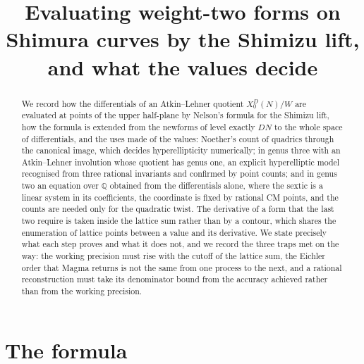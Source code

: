 \documentclass[11pt,reqno]{amsart}
\theoremstyle{plain}
\theoremstyle{definition}
\newcommand{\Q}{\mathbb{Q}}
\begin{document}
\title[Evaluating forms on Shimura curves by the Shimizu lift]
{Evaluating weight-two forms on Shimura curves by the Shimizu lift,\\
and what the values decide}

\author{}
\date{}

\begin{abstract}
We record how the differentials of an Atkin--Lehner quotient $X_0^D(N)/W$ are evaluated at
points of the upper half-plane by Nelson's formula for the Shimizu lift, how the formula is
extended from the newforms of level exactly $DN$ to the whole space of differentials, and the
uses made of the values: Noether's count of quadrics through the canonical image, which decides
hyperellipticity numerically; in genus three with an Atkin--Lehner involution whose quotient has
genus one, an explicit hyperelliptic model recognised from three rational invariants and confirmed
by point counts; and in genus two an equation over $\Q$ obtained from the differentials alone,
where the sextic is a linear system in its coefficients, the coordinate is fixed by rational CM
points, and the counts are needed only for the quadratic twist. The derivative of a form that the
last two require is taken inside the lattice sum rather than by a contour, which shares the
enumeration of lattice points between a value and its derivative. We state precisely what each
step proves and what it does not, and we record the three traps met on the way: the working
precision must rise with the cutoff of the lattice sum, the Eichler order that Magma returns is not
the same from one process to the next, and a rational reconstruction must take its denominator
bound from the accuracy achieved rather than from the working precision.
\end{abstract}

\maketitle

\section{The formula}
\end{document}
